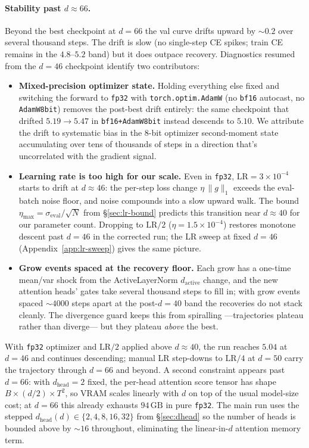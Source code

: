 \documentclass{article}
\begin{document}
\paragraph{Stability past $d \approx 66$.}
Beyond the best checkpoint at $d=66$ the val curve drifts upward by
$\sim 0.2$ over several thousand steps.  The drift is slow (no
single-step CE spikes; train CE remains in the $4.8$--$5.2$ band) but it
does outpace recovery.  Diagnostics resumed from the $d=46$ checkpoint
identify two contributors:
\begin{itemize}
\item \textbf{Mixed-precision optimizer state.}
  Holding everything else fixed and switching the forward to
  \texttt{fp32} with \texttt{torch.optim.AdamW} (no \texttt{bf16}
  autocast, no \texttt{AdamW8bit}) removes the post-best drift entirely:
  the same checkpoint that drifted $5.19 \to 5.47$ in
  \texttt{bf16+AdamW8bit} instead descends to $5.10$.  We attribute the
  drift to systematic bias in the 8-bit optimizer second-moment state
  accumulating over tens of thousands of steps in a direction that's
  uncorrelated with the gradient signal.
\item \textbf{Learning rate is too high for our scale.}
  Even in \texttt{fp32}, $\mathrm{LR}=3{\times}10^{-4}$ starts to drift
  at $d \approx 46$: the per-step loss change $\eta \,\|g\|_1$ exceeds
  the eval-batch noise floor, and noise compounds into a slow upward
  walk.  The bound
  $\eta_{\max} = \sigma_{\text{eval}}/\sqrt{N}$ from
  \S\ref{sec:lr-bound} predicts this transition near $d \approx 40$
  for our parameter count.  Dropping to $\mathrm{LR}/2$
  ($\eta = 1.5\!\times\!10^{-4}$) restores monotone descent past
  $d=46$ in the corrected run; the LR sweep at fixed $d=46$
  (Appendix~\ref{app:lr-sweep}) gives the same picture.
\item \textbf{Grow events spaced at the recovery floor.}
  Each grow has a one-time mean/var shock from the ActiveLayerNorm
  $d_{\text{active}}$ change, and the new attention heads' gates take
  several thousand steps to fill in; with grow events spaced
  ${\sim}4000$ steps apart at the post-$d=40$ band the recoveries do
  not stack cleanly.  The divergence guard keeps this from spiralling
  ---trajectories plateau rather than diverge--- but they plateau
  \emph{above} the best.
\end{itemize}
With \texttt{fp32} optimizer and $\mathrm{LR}/2$ applied above
$d \approx 40$, the run reaches $5.04$ at $d{=}46$ and continues
descending; manual LR step-downs to $\mathrm{LR}/4$ at $d{=}50$ carry
the trajectory through $d{=}66$ and beyond.  A second constraint
appears past $d{=}66$: with $d_{\text{head}}{=}2$ fixed, the per-head
attention score tensor has shape $B \times (d/2) \times T^2$, so VRAM
scales linearly with $d$ on top of the usual model-size cost; at
$d{=}66$ this already exhausts $94\,\text{GB}$ in pure \texttt{fp32}.
The main run uses the stepped $d_{\text{head}}(d) \in
\{2,4,8,16,32\}$ from \S\ref{sec:dhead} so the number of heads is
bounded above by $\sim 16$ throughout, eliminating the linear-in-$d$
attention memory term.
\end{document}

